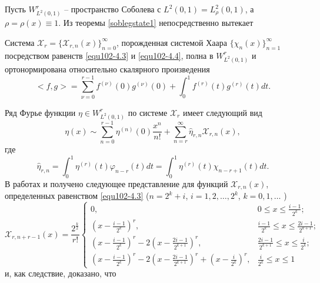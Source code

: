   Пусть $W^r_{L^2(0,1)}$ --  пространство Соболева с  $L^2(0,1)=L^2_\rho(0,1)$, а $\rho=\rho(x) \equiv 1$. Из теоремы \ref{soblegstate1} непосредственно вытекает
 \begin{corollary}\label{equcor2}
   Система $\mathcal{ X}_r=\{\mathcal{ X}_{r,n}(x)\}_{n=0}^\infty$, порожденная системой Хаара $\{\chi_{n}(x)\}_{n=1}^\infty$ посредством равенств \eqref{equ102-4.3} и \eqref{equ102-4.4}, полна  в $W^r_{L^2(0,1)}$ и ортонормирована относительно скалярного произведения
 \begin{equation}\label{equ102-4.5}
<f,g>=\sum_{\nu=0}^{r-1}f^{(\nu)}(0)g^{(\nu)}(0)+\int_{0}^{1} f^{(r)}(t)g^{(r)}(t) dt.
\end{equation}
 \end{corollary}

Ряд Фурье функции $\eta\in W^r_{L^2(0,1)}$ по системе $\mathcal{ X}_r$ имеет следующий вид
  \begin{equation}\label{equ102-4.6}
\eta(x)\sim \sum_{n=0}^{r-1} \eta^{(n)}(0)\frac{x^n}{n!}+ \sum_{n=r}^\infty\hat \eta_{r,n}\mathcal{ X}_{r,n}(x),
\end{equation}
где
  $$
\hat \eta_{r,n}=\int_0^1 \eta^{(r)}(t)\varphi_{n-r}(t)dt=\int_0^1 \eta^{(r)}(t) \chi_{n-r+1}(t)dt.
$$
В работах \cite{equ102-Shar19} и \cite{equ102-Shar20}  получено  следующее представление для функций $\mathcal{ X}_{r,n}(x)$, определенных равенством \eqref{equ102-4.3}
 ($n=2^k+i$, $i=1,2,\ldots,2^k $, $k=0,1,\ldots$ )
  \begin{equation}\label{equ102-4.7}
 \mathcal{ X}_{r,n+r-1}(x)=\frac{2^{\frac{k}{2}}}{r!}
 \begin{cases} 0,&\text{$0\le x\le\frac{i-1}{2^k}$;}\\
 (x-\frac{i-1}{2^k})^r,&\text{$\frac{i-1}{2^k}\le x\le \frac{2i-1}{2^{k+1}}$;}\\
 (x-\frac{i-1}{2^k})^r-2(x-\frac{2i-1}{2^{k+1}})^r,&\text{$\frac{2i-1}{2^{k+1}}\le x\le \frac{i}{2^{k}}$;}\\
  (x-\frac{i-1}{2^k})^r-2(x-\frac{2i-1}{2^{k+1}})^r+(x-\frac{i}{2^{k}})^r, &\text{$\frac{i}{2^{k}}\le x\le1$}
   \end{cases}
  \end{equation}
 и, как следствие, доказано, что


